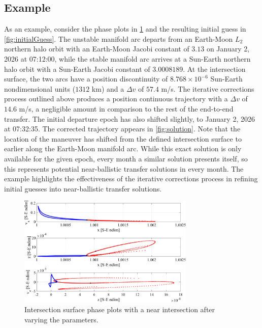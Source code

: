 \subsection{Example}
As an example, consider the phase plots in \cref{fig:phasePlotsIntersect} and the resulting initial
guess in \cref{fig:initialGuess}. The unstable manifold arc departs from an Earth-Moon $L_{2}$
northern halo orbit with an Earth-Moon Jacobi constant of $3.13$ on January 2, 2026 at 07:12:00,
while the stable manifold arc arrives at a Sun-Earth northern halo orbit with a Sun-Earth Jacobi
constant of $3.0008189$. At the intersection surface, the two arcs have a position discontinuity of
$8.768\times10^{-6}$ Sun-Earth nondimensional units ($1312$ km) and a $\Delta v$ of $57.4$ m/s. The
iterative corrections process outlined above produces a position continuous trajectory with a
$\Delta v$ of $14.6$ m/s, a negligible amount in comparison to the rest of the end-to-end transfer.
The initial departure epoch has also shifted slightly, to January 2, 2026 at 07:32:35. The
corrected trajectory appears in \cref{fig:solution}. Note that the location of the maneuver has
shifted from the defined intersection surface to earlier along the Earth-Moon manifold arc. While
this exact solution is only available for the given epoch, every month a similar solution presents
itself, so this represents potential near-ballistic transfer solutions in every month. The
example highlights the effectiveness of the iterative corrections process in refining initial
guesses into near-ballistic transfer solutions.
\vspace{45mm}

\begin{figure}[H]
    \centering
    \includegraphics[width=0.75\textwidth]{figures/PhasePlotsIntersect.pdf}
    \caption{Intersection surface phase plots with a near intersection after varying the parameters.}
    \label{fig:phasePlotsIntersect}
\end{figure}

